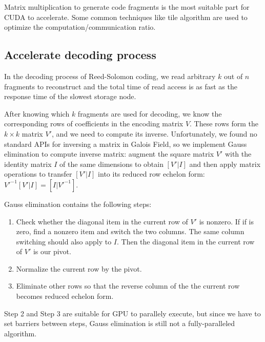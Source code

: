 \documentclass[a4paper]{article}
\begin{document}
Matrix multiplication to generate code fragments is the most suitable part for CUDA to accelerate.
Some common techniques like tile algorithm are used to optimize the computation/communication ratio.


\subsection{Accelerate decoding process}

In the decoding process of Reed-Solomon coding, 
we read arbitrary $k$ out of $n$ fragments to reconstruct and the total time of read access is as fast as the response time of the slowest storage node.



After knowing which $k$ fragments are used for decoding, we know the corresponding rows of coefficients in the encoding matrix $V$.
These rows form the $k \times k$ matrix $V'$, and we need to compute its inverse.
Unfortunately, we found no standard APIs for inversing a matrix in Galois Field, 
so we implement Gauss elimination to compute inverse matrix: 
augment the square matrix $V'$ with the identity matrix $I$ of the same dimensions to obtain $[V' | I]$ and then apply matrix operations to transfer $[V' | I]$ into its reduced row echelon form: $V'^{-1}[V' | I] = [I | V'^{-1}]$.

Gauss elimination contains the following steps:
\begin{enumerate}
\item Check whether the diagonal item in the current row of $V'$ is nonzero. If if is zero, find a nonzero item and switch the two columns. The same column switching should also apply to $I$. Then the diagonal item in the current row of $V'$ is our pivot.
\item Normalize the current row by the pivot.
\item Eliminate other rows so that the reverse column of the the current row becomes reduced echelon form.
\end{enumerate}
Step 2 and Step 3 are suitable for GPU to parallely execute, but since we have to set barriers between steps, Gauss elimination is still not a fully-paralleled algorithm.
\end{document}

